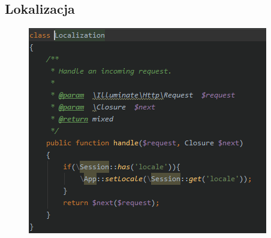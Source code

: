 \documentclass[11pt,a4paper]{article}
\begin{document}
\subsection{\textbf{Lokalizacja}}
\begin{figure} [h]
\centering
\includegraphics [keepaspectratio] {1.11.png}
\end{figure}
\newpage
\end{document}
